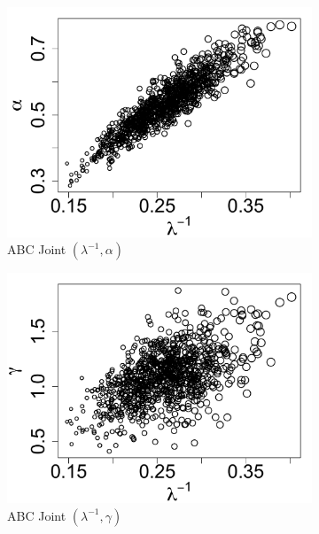 \documentclass[ejs]{imsart}
\numberwithin{equation}{section}
\theoremstyle{plain}
\begin{document}
\begin{figure}[htbp]
   \centering
\begin{subfigure}{0.32\textwidth}
\centering
\includegraphics[width = \textwidth]{figures/bate_joint_k_alpha.pdf} 
\caption{ABC Joint $(\lambda^{-1}, \alpha)$}\label{subfig:joint_alpha_k_bate}
\end{subfigure}
\begin{subfigure}{0.32\textwidth}
\centering
\includegraphics[width = \textwidth]{figures/bate_joint_k_gamma.pdf} 
\caption{ABC Joint $(\lambda^{-1}, \gamma)$}\label{subfig:joint_gamma_k_bate}
\end{subfigure}
\begin{subfigure}{0.32\textwidth}

\end{subfigure}
\end{figure}
\end{document}
